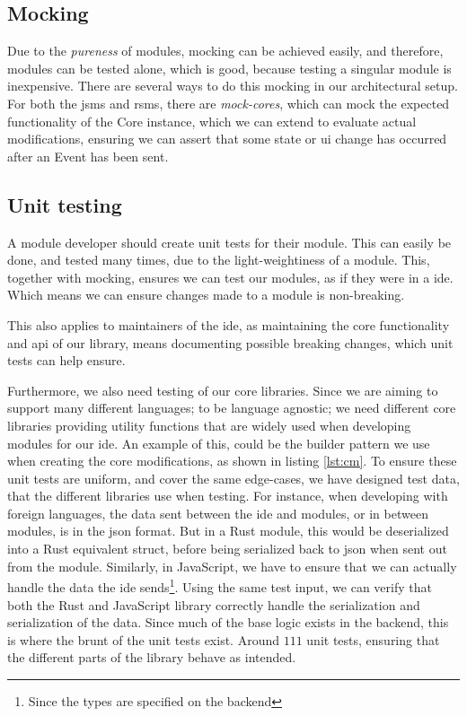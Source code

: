 \subsection{Mocking}

Due to the \textit{pureness} of modules, mocking can be achieved easily, and
therefore, modules can be tested alone, which is good, because testing a
singular module is inexpensive. There are several ways to do this mocking in our
architectural setup. For both the \gls*{jsms} and \gls*{rsms}, there are
\textit{mock-cores}, which can mock the expected functionality of the Core
instance, which we can extend to evaluate actual modifications, ensuring we can
assert that some state or \gls*{ui} change has occurred after an Event has been
sent.

\subsection{Unit testing}

A module developer should create unit tests for their module. This can easily be
done, and tested many times, due to the light-weightiness of a module. This,
together with mocking, ensures we can test our modules, as if they were in a
\gls*{ide}. Which means we can ensure changes made to a module is non-breaking.

This also applies to maintainers of the \gls*{ide}, as maintaining the core
functionality and \gls*{api} of our library, means documenting possible breaking
changes, which unit tests can help ensure.

Furthermore, we also need testing of our core libraries. Since we are aiming to
support many different languages; to be language agnostic; we need different core
libraries providing utility functions that are widely used when developing
modules for our \gls{ide}. An example of this, could be the builder pattern we
use when creating the core modifications, as shown in listing \ref{lst:cm}.
To ensure these unit tests are uniform, and cover the same edge-cases, we have
designed test data, that the different libraries use when testing. For instance,
when developing with foreign languages, the data sent between the \gls{ide} and
modules, or in between modules, is in the \gls{json} format. But in a Rust
module, this would be deserialized into a Rust equivalent struct, before being
serialized back to \gls{json} when sent out from the module. Similarly, in
JavaScript, we have to ensure that we can actually handle the data the \gls{ide}
sends\footnote{Since the types are specified on the backend}. Using the same
test input, we can verify that both the Rust and JavaScript library correctly
handle the serialization and serialization of the data. Since much of the base
logic exists in the backend, this is where the brunt of the unit tests exist.
Around $111$ unit tests, ensuring that the different parts of the library
behave as intended.


